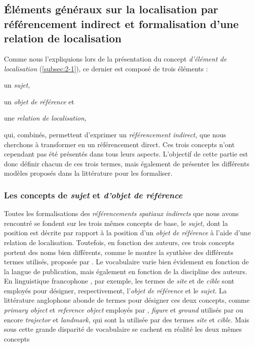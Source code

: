 

\subsection{Éléments généraux sur la localisation par référencement
  indirect et formalisation d'une relation de localisation}

Comme nous l'expliquions lors de la présentation du concept
\emph{d'élément de localisation} (\autoref{subsec:2-1}), ce dernier
est composé de trois éléments :
%
\begin{enumerate*}[label=(\alph*)]
\item \label{i:site} un \emph{sujet,}
\item \label{i:cible} un \emph{objet de référence} et
\item une \emph{relation de localisation,}
\end{enumerate*}
%
qui, combinés, permettent d'exprimer un \emph{référencement indirect,}
que nous cherchons à transformer en un référencement direct. Ces trois
concepts n'ont cependant pas été présentés dans tous leurs
aspects. L'objectif de cette partie est donc définir chacun de ces
trois termes, mais également de présenter les différents modèles
proposés dans la littérature pour les formaliser.

\subsubsection{Les concepts de \emph{sujet} et \emph{d'objet de
    référence}}

Toutes les formalisations des \emph{référencements spatiaux indirects}
que nous avons rencontré se fondent sur les trois mêmes concepts de
base, le \emph{sujet,} dont la position est décrite par rapport à la
position d'un \emph{objet de référence} à l'aide d'une relation de
localisation. Toutefois, en fonction des auteurs, ces trois concepts
portent des noms bien différents, comme le montre la synthèse des
différents termes utilisés, proposée par
\textcite{RetzSchmidt1988}. Le vocabulaire varie bien évidement en
fonction de la langue de publication, mais également en fonction de la
discipline des auteurs. En linguistique francophone
\autocite{Vandeloise1986,Borillo1998, Aurnague1997, Mathet2000}, par
exemple, les termes de \emph{site} et de \emph{cible} sont employés
pour désigner, respectivement, l'\emph{objet de référence} et le
\emph{sujet.}
%
La littérature anglophone abonde de termes pour désigner ces deux
concepts, comme \emph{primary object} et \emph{reference object}
employés par \textcite{RetzSchmidt1988, Clementini2013}, \emph{figure}
et \emph{ground} utilisés par \textcite{Talmy1983} ou encore
\emph{trajector} et \emph{landmark,} qui sont la utilisée par
\textcite{Vandeloise1984} des termes \emph{site} et \emph{cible.}
%
Mais sous cette grande disparité de vocabulaire se cachent en réalité
les deux mêmes concepts

